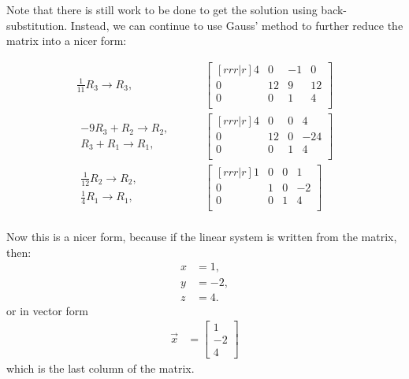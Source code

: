 Note that there is still work to be done to get the solution using back-sub\-sti\-tution.  Instead, we can continue to use Gauss' method to further reduce the matrix into a nicer form:

\begin{align*}
\frac{1}{11} R_3 \rightarrow R_3, & \qquad
\begin{bmatrix}[rrr|r]
4 & 0 & -1 & 0 \\
0 & 12 & 9 & 12 \\
0 & 0 & 1 & 4 \\
\end{bmatrix}  \\
\begin{array}{r}
-9R_3+R_2 \rightarrow R_2, \\
R_3 + R_1 \rightarrow R_1,
\end{array} & \qquad
\begin{bmatrix}[rrr|r]
4 & 0 & 0 & 4 \\
0 & 12 & 0 & -24 \\
0 & 0 & 1 & 4 \\
\end{bmatrix}  \\
\begin{array}{r}
\frac{1}{12} R_2 \rightarrow R_2, \\[4pt]
\frac{1}{4} R_1 \rightarrow R_1,
\end{array} & \qquad
\begin{bmatrix}[rrr|r]
1 & 0 & 0 & 1 \\
0 & 1 & 0 & -2 \\
0 & 0 & 1 & 4 \\
\end{bmatrix}  \\
\end{align*}

Now this is a nicer form, because if the linear system is written from the matrix, then:
%
\begin{align*}
x & = 1, \\
y & = -2, \\
z & = 4.
\end{align*}
or in vector form
%
\begin{align*}
\vec{x} & = \begin{bmatrix}
1 \\ -2 \\ 4
\end{bmatrix}
\end{align*}
which is the last column of the matrix.

